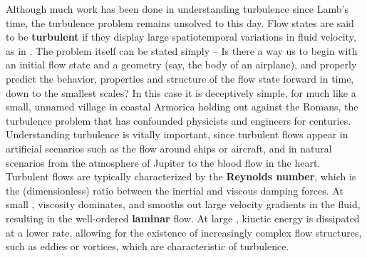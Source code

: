 Although much work has been done in understanding turbulence since Lamb's time, the turbulence problem remains unsolved to this day. Flow states are said to be {\bf turbulent} if they display large spatiotemporal variations in fluid velocity, as in . The problem itself can be stated simply -- Is there a way us to begin with an initial flow state and a geometry (say, the body of an airplane), and properly predict the behavior, properties and structure of the flow state forward in time, down to the smallest scales?  In this case it is deceptively simple, for much like a small, unnamed village in coastal Armorica holding out against the Romans, the turbulence problem that has confounded physicists and engineers for centuries. Understanding turbulence is vitally important, since turbulent flows appear in artificial scenarios such as the flow around ships or aircraft, and in natural scenarios from the atmosphere of Jupiter to the blood flow in the heart.  Turbulent flows are typically characterized by the {\bf Reynolds number}, which is the (dimensionless) ratio between the inertial and viscous damping forces. At small \ReN, viscosity dominates, and smooths out large velocity gradients in the fluid, resulting in the well-ordered {\bf laminar} flow. At large \ReN, kinetic energy is dissipated at a lower rate, allowing for the existence of increasingly complex flow structures, such as eddies or vortices, which are characteristic of turbulence.
